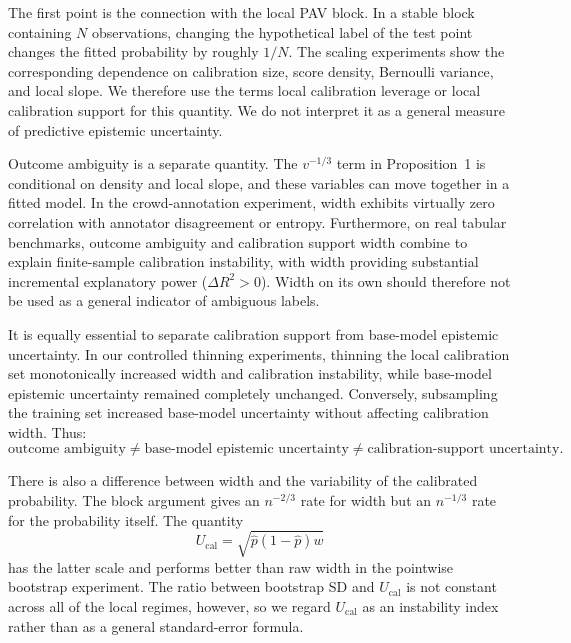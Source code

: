 \documentclass[11pt]{article}
\begin{document}
	The first point is the connection with the local PAV block. In a stable block containing $N$ observations, changing the hypothetical label of the test point changes the fitted probability by roughly $1/N$. The scaling experiments show the corresponding dependence on calibration size, score density, Bernoulli variance, and local slope. We therefore use the terms local calibration leverage or local calibration support for this quantity. We do not interpret it as a general measure of predictive epistemic uncertainty.

	Outcome ambiguity is a separate quantity. The $v^{-1/3}$ term in Proposition~1 is conditional on density and local slope, and these variables can move together in a fitted model. In the crowd-annotation experiment, width exhibits virtually zero correlation with annotator disagreement or entropy. Furthermore, on real tabular benchmarks, outcome ambiguity and calibration support width combine to explain finite-sample calibration instability, with width providing substantial incremental explanatory power ($\Delta R^2 > 0$). Width on its own should therefore not be used as a general indicator of ambiguous labels.

	It is equally essential to separate calibration support from base-model epistemic uncertainty. In our controlled thinning experiments, thinning the local calibration set monotonically increased width and calibration instability, while base-model epistemic uncertainty remained completely unchanged. Conversely, subsampling the training set increased base-model uncertainty without affecting calibration width. Thus:
	\begin{equation*}
		\text{outcome ambiguity} \neq \text{base-model epistemic uncertainty} \neq \text{calibration-support uncertainty}.
	\end{equation*}

	There is also a difference between width and the variability of the calibrated probability. The block argument gives an $n^{-2/3}$ rate for width but an $n^{-1/3}$ rate for the probability itself. The quantity
	\begin{equation}
		U_{\mathrm{cal}}=\sqrt{\hat p(1-\hat p)w}
	\end{equation}
	has the latter scale and performs better than raw width in the pointwise bootstrap experiment. The ratio between bootstrap SD and $U_{\mathrm{cal}}$ is not constant across all of the local regimes, however, so we regard $U_{\mathrm{cal}}$ as an instability index rather than as a general standard-error formula.
\end{document}
